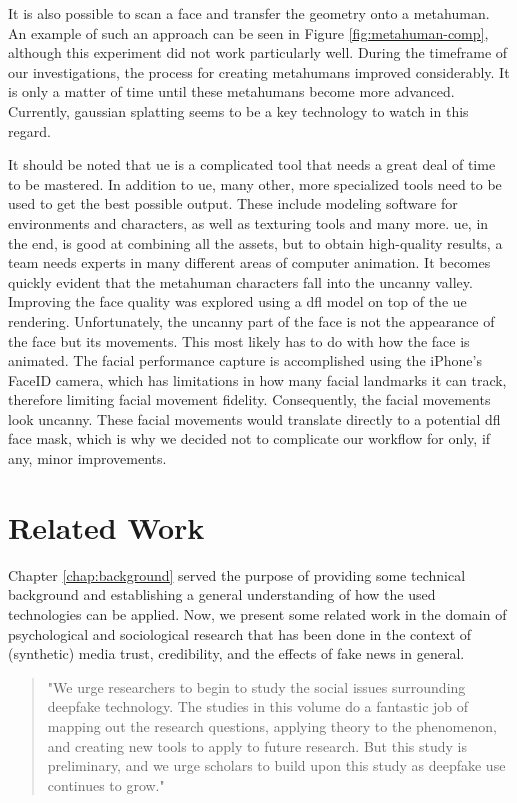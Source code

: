 \documentclass[
  a4paper,  %
  twoside,  %
  bibliography=totoc,
  headsepline,
  cleardoublepage=empty,
  parskip=half,
  draft=false
]{scrbook}
\begin{document}
It is also possible to scan a face and transfer the geometry onto a metahuman. An example of such an approach can be seen in Figure \ref{fig:metahuman-comp}, although this experiment did not work particularly well. During the timeframe of our investigations, the process for creating metahumans improved considerably. It is only a matter of time until these metahumans become more advanced. Currently, gaussian splatting seems to be a key technology to watch in this regard.

It should be noted that \gls{ue} is a complicated tool that needs a great deal of time to be mastered. In addition to \gls{ue}, many other, more specialized tools need to be used to get the best possible output. These include modeling software for environments and characters, as well as texturing tools and many more. \gls{ue}, in the end, is good at combining all the assets, but to obtain high-quality results, a team needs experts in many different areas of computer animation. It becomes quickly evident that the metahuman characters fall into the uncanny valley. Improving the face quality was explored using a \gls{dfl} model on top of the \gls{ue} rendering. Unfortunately, the uncanny part of the face is not the appearance of the face but its movements. This most likely has to do with how the face is animated. The facial performance capture is accomplished using the iPhone's FaceID camera, which has limitations in how many facial landmarks it can track, therefore limiting facial movement fidelity. Consequently, the facial movements look uncanny. These facial movements would translate directly to a potential \gls{dfl} face mask, which is why we decided not to complicate our workflow for only, if any, minor improvements.

\chapter{Related Work}
\label{chap:rel-work}
Chapter \ref{chap:background} served the purpose of providing some technical background and establishing a general understanding of how the used technologies can be applied. Now, we present some related work in the domain of psychological and sociological research that has been done in the context of (synthetic) media trust, credibility, and the effects of fake news in general. 

\begin{quotation}
  "We urge researchers to begin to study the social issues surrounding deepfake technology. The studies in this volume do a fantastic job of mapping out the research questions, applying theory to the phenomenon, and creating new tools to apply to future research. But this study is preliminary, and we urge scholars to build upon this study as deepfake use continues to grow." \cite[p. 151]{hancockSocialImpactDeepfakes2021}
\end{quotation}
\end{document}

